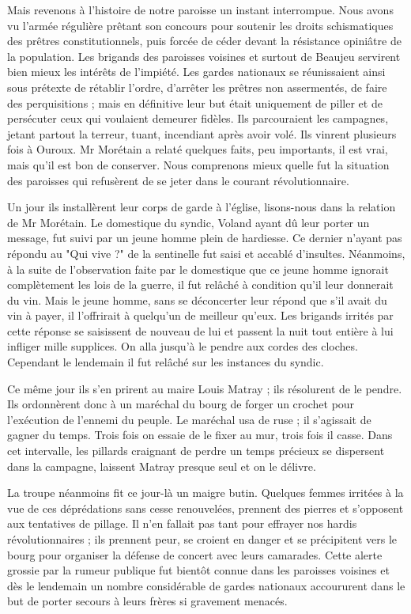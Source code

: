Mais revenons à l'histoire de notre paroisse un instant interrompue. Nous avons vu l'armée régulière prêtant son concours pour soutenir les droits schismatiques des prêtres constitutionnels, puis forcée de céder devant la résistance opiniâtre de la population. Les brigands des paroisses voisines et surtout de Beaujeu servirent bien mieux les intérêts de l'impiété. Les gardes nationaux se réunissaient ainsi sous prétexte de rétablir l'ordre, d'arrêter les prêtres non assermentés, de faire des perquisitions ; mais en définitive leur but était uniquement de piller et de persécuter ceux qui voulaient demeurer fidèles. Ils parcouraient les campagnes, jetant partout la terreur, tuant, incendiant après avoir volé. Ils vinrent plusieurs fois à Ouroux. Mr Morétain a relaté quelques faits, peu importants, il est vrai, mais qu'il est bon de conserver. Nous comprenons mieux quelle fut la situation des paroisses qui refusèrent de se jeter dans le courant révolutionnaire.

Un jour ils installèrent leur corps de garde à l'église, lisons-nous dans la relation de Mr Morétain. Le domestique du syndic, Voland ayant dû leur porter un message, fut suivi par un jeune homme plein
de hardiesse. Ce dernier n'ayant pas répondu au "Qui vive ?" de la sentinelle fut saisi et accablé d'insultes. Néanmoins, à la suite de l'observation faite par le domestique que ce jeune homme ignorait complètement les lois de la guerre, il fut relâché à condition qu'il leur donnerait du vin. Mais le jeune homme, sans se déconcerter leur répond que s'il avait du vin à payer, il l'offrirait à quelqu'un de meilleur qu'eux. Les brigands irrités par cette réponse se saisissent de nouveau de lui et passent la nuit tout entière à lui infliger mille supplices. On alla jusqu'à le pendre aux cordes des cloches. Cependant le lendemain il fut relâché sur les instances du syndic.

Ce même jour ils s'en prirent au maire Louis Matray ; ils résolurent de le pendre. Ils ordonnèrent donc à un maréchal du bourg de forger un crochet pour l'exécution de l'ennemi du peuple. Le maréchal usa de ruse ; il s'agissait de gagner du temps. Trois fois on essaie de le fixer au mur, trois fois il casse. Dans cet intervalle, les pillards craignant de perdre un temps précieux se dispersent dans la campagne, laissent Matray presque seul et on le délivre.

La troupe néanmoins fit ce jour-là un maigre butin. Quelques femmes irritées à la vue de ces déprédations sans cesse renouvelées, prennent des pierres et s'opposent aux tentatives de pillage. Il n'en fallait pas tant pour effrayer nos hardis révolutionnaires ; ils prennent peur, se croient en danger et se précipitent vers le bourg pour organiser la défense de concert avec leurs camarades. Cette alerte grossie par la rumeur publique fut bientôt connue dans les paroisses voisines et dès le lendemain un nombre considérable de gardes nationaux accoururent dans le but de porter secours à leurs frères si gravement menacés.


